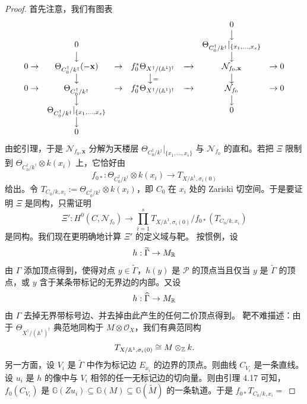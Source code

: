 \begin{proof}
首先注意，我们有图表
\[
\begin{array}{ccccccc}
 & & & & & 0 & \\
 & & & & & \big\downarrow & \\
 & 0 & & & & \Theta_{C^\dagger_0/k^\dagger}|_{\{x_1,\dots,x_s\}} & \\
 & \big\downarrow & & & & \big\downarrow & \\
0\to & \Theta_{C^\dagger_0/k^\dagger}(-\mathbf{x}) & \to & f_0^*\Theta_{X^\dagger/(\mathbb{A}^1)^\dagger} & \xrightarrow{\ \ } & \mathcal N_{f_0,\mathbf{x}} & \to 0\\
 & \big\downarrow & & \big\downarrow{\scriptstyle =} & & \big\downarrow & \\
0\to & \Theta_{C^\dagger_0/k^\dagger} & \to & f_0^*\Theta_{X^\dagger/(\mathbb{A}^1)^\dagger} & \xrightarrow{\ \ } & \mathcal N_{f_0} & \to 0\\
 & \big\downarrow & & & & \big\downarrow & \\
 & \Theta_{C^\dagger_0/k^\dagger}|_{\{x_1,\dots,x_s\}} & & & & 0 & \\
 & \big\downarrow & & & & & \\
 & 0 & & & & &
\end{array}
\]
由蛇引理，于是 $\mathcal N_{f_0,\mathbf{x}}$ 分解为天楼层 $\Theta_{C^\dagger_0/k^\dagger}|_{\{x_1,\dots,x_s\}}$ 与 $\mathcal N_{f_0}$ 的直和。若把 $\Xi$ 限制到 $\Theta_{C^\dagger_0/k^\dagger}\otimes k(x_i)$ 上，它恰好由
\[
f_{0*}:\Theta_{C^\dagger_0/k^\dagger}\otimes k(x_i)\to T_{X/\mathbb{A}^1,\sigma_i(0)}
\]
给出。令 $T_{C_0/k,x_i}:=\Theta_{C^\dagger_0/k^\dagger}\otimes k(x_i)$，即 $C_0$ 在 $x_i$ 处的 Zariski 切空间。于是要证明 $\Xi$ 是同构，只需证明
\[
\Xi':H^0(C,\mathcal N_{f_0})\to\prod_{i=1}^sT_{X/\mathbb{A}^1,\sigma_i(0)}/f_{0*}(T_{C_0/k,x_i})
\]
是同构。我们现在更明确地计算 $\Xi'$ 的定义域与靶。
按惯例，设
\[
h:\widetilde\Gamma\to M_{\mathbb{R}}
\]
由 $\Gamma$ 添加顶点得到，使得对点 $y\in\widetilde\Gamma$，$h(y)$ 是 $\mathcal P$ 的顶点当且仅当 $y$ 是 $\widetilde\Gamma$ 的顶点，或 $y$ 含于某条带标记的无界边的内部。又设
\[
h:\widehat\Gamma\to M_{\mathbb{R}}
\]
由 $\Gamma$ 去掉无界带标号边、并去掉由此产生的任何二价顶点得到。
靶不难描述：由于 $\Theta_{X^\dagger/(\mathbb{A}^1)^\dagger}$ 典范地同构于 $M\otimes\mathcal O_X$，我们有典范同构
\[
T_{X/\mathbb{A}^1,\sigma_i(0)}\cong M\otimes_{\mathbb{Z}} k .
\]
另一方面，设 $V_i$ 是 $\widetilde\Gamma$ 中作为标记边 $E_{x_i}$ 的边界的顶点。则曲线 $C_{V_i}$ 是一条直线。设 $u_i$ 是 $h$ 的像中与 $V_i$ 相邻的任一无标记边的切向量。则由引理 4.17 可知，$f_0(C_{V_i})$ 是 $\mathbb{G}(Zu_i)\subseteq\mathbb{G}(M)\subseteq\mathbb{G}(\widetilde M)$ 的一条轨道。于是 $f_{0*}T_{C_0/k,x_i}=$


\end{proof}
